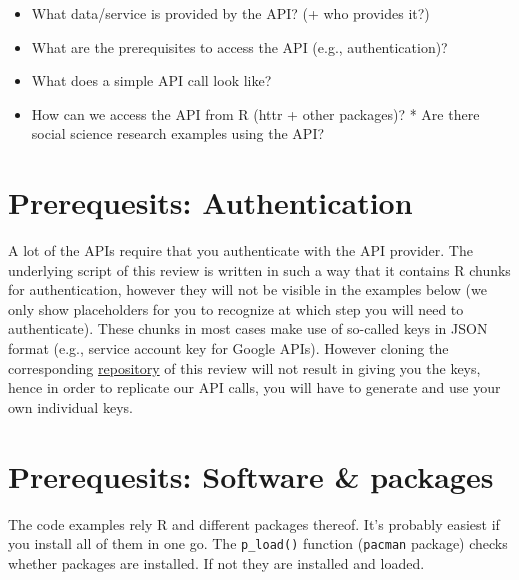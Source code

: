 \documentclass[
]{book}
\providecommand{\tightlist}{%
  \setlength{\itemsep}{0pt}\setlength{\parskip}{0pt}}
\begin{document}
\begin{itemize}
\tightlist
\item
  What data/service is provided by the API? (+ who provides it?)
\item
  What are the prerequisites to access the API (e.g., authentication)?
\item
  What does a simple API call look like?
\item
  How can we access the API from R (httr + other packages)? * Are there social science research examples using the API?
\end{itemize}

\hypertarget{prerequesits-authentication}{%
\section{Prerequesits: Authentication}\label{prerequesits-authentication}}

A lot of the APIs require that you authenticate with the API provider. The underlying script of this review is written in such a way that it contains R chunks for authentication, however they will not be visible in the examples below (we only show placeholders for you to recognize at which step you will need to authenticate). These chunks in most cases make use of so-called keys in JSON format (e.g., service account key for Google APIs). However cloning the corresponding \href{\%22https://github.com/paulcbauer/apis_for_social_scientists_a_review\%22}{repository} of this review will not result in giving you the keys, hence in order to replicate our API calls, you will have to generate and use your own individual keys.

\hypertarget{prerequesits-software-packages}{%
\section{Prerequesits: Software \& packages}\label{prerequesits-software-packages}}

The code examples rely R and different packages thereof. It's probably easiest if you install all of them in one go. The \texttt{p\_load()} function (\texttt{pacman} package) checks whether packages are installed. If not they are installed and loaded.
\end{document}
